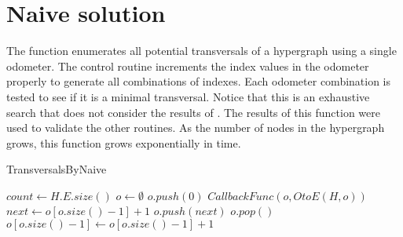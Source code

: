 

















\chapter{Naive solution}

The  function enumerates all potential transversals of a hypergraph using a single odometer. The control routine increments the index values in the odometer properly to generate all combinations of indexes. Each odometer combination is tested to see if it is a minimal transversal. Notice that this is an exhaustive search that does not consider the results of . The results of this function were used to validate the other routines. As the number of nodes in the hypergraph grows, this function grows exponentially in time. 

\begin{algorithm}[H]
    \centering
	\caption{TransversalsByNaive}\label{TransversalsByNaive}
	\begin{algorithmic}[1]
		\State $count \gets H.E.size()$
		\State $o \gets \emptyset$ 
		\State $o.push(0)$
		 {}
		\State $CallbackFunc(o,OtoE(H,o))$
		\EndIf
		\State $next \gets o[o.size()-1] + 1$ 
		\State $o.push(next)$
		\Else
		\State $o.pop()$
		\State $o[o.size()-1] \gets o[o.size()-1] +1 $
		\EndIf
		\EndIf
		\EndWhile
		\EndFunction
	\end{algorithmic}
\end{algorithm}